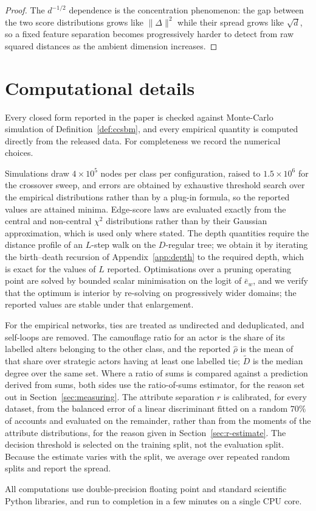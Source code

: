 \documentclass[onecolumn,pdflatex,sn-basic,Numbered]{sn-jnl}
\theoremstyle{thmstyleone}
\theoremstyle{thmstylethree}
\begin{document}
\begin{appendices}
\begin{proof}
The $d^{-1/2}$ dependence is the concentration phenomenon: the gap between the two
score distributions grows like $\|\Delta\|^2$ while their spread grows like
$\sqrt{d}$, so a fixed feature separation becomes progressively harder to detect
from raw squared distances as the ambient dimension increases.
\end{proof}

\section{Computational details}
\label{app:repro}

Every closed form reported in the paper is checked against Monte-Carlo simulation of
Definition~\ref{def:ccsbm}, and every empirical quantity is computed directly from the
released data. For completeness we record the numerical choices.

Simulations draw $4\times10^{5}$ nodes per class per configuration, raised to
$1.5\times10^{6}$ for the crossover sweep, and errors are obtained by exhaustive
threshold search over the empirical distributions rather than by a plug-in formula, so
the reported values are attained minima. Edge-score laws are evaluated exactly from the
central and non-central $\chi^2$ distributions rather than by their Gaussian
approximation, which is used only where stated. The depth quantities require the
distance profile of an $L$-step walk on the $D$-regular tree; we obtain it by iterating
the birth--death recursion of Appendix~\ref{app:depth} to the required depth, which is
exact for the values of $L$ reported. Optimisations over a pruning operating point are
solved by bounded scalar minimisation on the logit of $\bar e_w$, and we verify that the
optimum is interior by re-solving on progressively wider domains; the reported values
are stable under that enlargement.

For the empirical networks, ties are treated as undirected and deduplicated, and
self-loops are removed. The camouflage ratio for an actor is the share of its labelled
alters belonging to the other class, and the reported $\hat\rho$ is the mean of that
share over strategic actors having at least one labelled tie; $\tilde D$ is the median
degree over the same set. Where a ratio of sums is compared against a prediction
derived from sums, both sides use the ratio-of-sums estimator, for the reason set out
in Section~\ref{sec:measuring}. The attribute separation $r$ is calibrated, for every dataset, from the
balanced error of a linear discriminant fitted on a random $70\%$ of accounts and
evaluated on the remainder, rather than from the moments of the attribute
distributions, for the reason given in Section~\ref{sec:r-estimate}. The decision
threshold is selected on the training split, not the evaluation split. Because the
estimate varies with the split, we average over repeated random splits and report the
spread.

All computations use double-precision floating point and standard scientific Python
libraries, and run to completion in a few minutes on a single CPU core.

\end{appendices}
\end{document}
